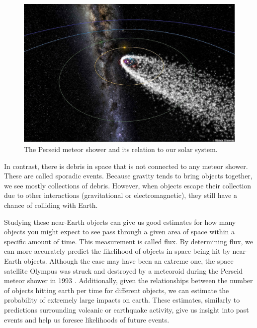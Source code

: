 \begin{figure}[ht!]
  \centering
  \includegraphics[scale=0.7]{images/persiod_shower.jpg}
  \caption{The Perseid meteor shower and its relation to our solar system.}
  \label{perceid}
\end{figure}

In contrast, there is debris in space that is not connected to any meteor shower. 
These are called sporadic events. 
Because gravity tends to bring objects together, we see mostly collections of debris.
However, when objects escape their collection due to other interactions (gravitational or electromagnetic), they still have a chance of colliding with Earth.

Studying these near-Earth objects can give us good estimates for how many objects you might expect to see pass through a given area of space within a specific amount of time.
This measurement is called flux.
By determining flux, we can more accurately predict the likelihood of objects in space being hit by near-Earth objects. 
Although the case may have been an extreme one, the space satellite Olympus was struck and destroyed by a meteoroid during the Perseid meteor shower in 1993 \cite{bobrowsky_comet/asteroid_nodate}.
Additionally, given the relationships between the number of objects hitting earth per time for different objects, we can estimate the probability of extremely large impacts on earth.
These estimates, similarly to predictions surrounding volcanic or earthquake activity, give us insight into past events and help us foresee likelihoods of future events.








